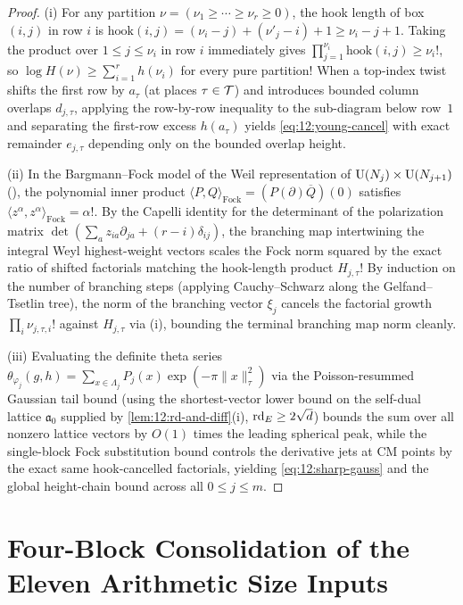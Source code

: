 \begin{proof}
(i) For any partition $\nu = (\nu_1 \ge \cdots \ge \nu_r \ge 0)$, the hook length of box $(i, j)$ in row $i$ is $\mathrm{hook}(i, j) = (\nu_i - j) + (\nu'_j - i) + 1 \ge \nu_i - j + 1$. Taking the product over $1 \le j \le \nu_i$ in row $i$ immediately gives $\prod_{j=1}^{\nu_i} \mathrm{hook}(i, j) \ge \nu_i!$, so $\log H(\nu) \ge \sum_{i=1}^r h(\nu_i)$ for every pure partition! When a top-index twist shifts the first row by $a_\tau$ (at places $\tau \in \mathcal{T}$) and introduces bounded column overlaps $d_{j,\tau}$, applying the row-by-row inequality to the sub-diagram below row~$1$ and separating the first-row excess $h(a_\tau)$ yields \eqref{eq:12:young-cancel} with exact remainder $e_{j,\tau}$ depending only on the bounded overlap height.

(ii) In the Bargmann--Fock model of the Weil representation of $\mathrm{U}(N_j) \times \mathrm{U}(N_{j+1})$ (), the polynomial inner product $\langle P, Q \rangle_{\mathrm{Fock}} = (P(\partial)\overline{Q})(0)$ satisfies $\langle z^\alpha, z^\alpha \rangle_{\mathrm{Fock}} = \alpha!$. By the Capelli identity for the determinant of the polarization matrix $\det(\sum_a z_{ia}\partial_{ja} + (r - i)\delta_{ij})$, the branching map intertwining the integral Weyl highest-weight vectors scales the Fock norm squared by the exact ratio of shifted factorials matching the hook-length product $H_{j,\tau}$! By induction on the number of branching steps (applying Cauchy--Schwarz along the Gelfand--Tsetlin tree), the norm of the branching vector $\xi_j$ cancels the factorial growth $\prod_i \nu_{j,\tau,i}!$ against $H_{j,\tau}$ via (i), bounding the terminal branching map norm cleanly.

(iii) Evaluating the definite theta series $\theta_{\varphi_j}(g, h) = \sum_{x \in \Lambda_j} P_j(x)\exp(-\pi \|x\|_\tau^2)$ via the Poisson-resummed Gaussian tail bound (using the shortest-vector lower bound on the self-dual lattice $\mathfrak{a}_0$ supplied by \cref{lem:12:rd-and-diff}(i), $\mathrm{rd}_E \ge 2\sqrt{d}$) bounds the sum over all nonzero lattice vectors by $O(1)$ times the leading spherical peak, while the single-block Fock substitution bound controls the derivative jets at CM points by the exact same hook-cancelled factorials, yielding \eqref{eq:12:sharp-gauss} and the global height-chain bound across all $0 \le j \le m$.
\end{proof}

\section{Four-Block Consolidation of the Eleven Arithmetic Size Inputs}
\label{sec:12:four-blocks}

